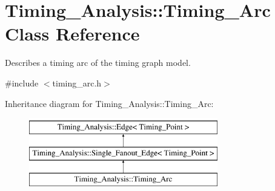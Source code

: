 \hypertarget{classTiming__Analysis_1_1Timing__Arc}{\section{Timing\-\_\-\-Analysis\-:\-:Timing\-\_\-\-Arc Class Reference}
\label{classTiming__Analysis_1_1Timing__Arc}
}


Describes a timing arc of the timing graph model.  




{\ttfamily \#include $<$timing\-\_\-arc.\-h$>$}

Inheritance diagram for Timing\-\_\-\-Analysis\-:\-:Timing\-\_\-\-Arc\-:\begin{figure}[H]
\begin{center}
\leavevmode
\includegraphics[height=3.000000cm]{classTiming__Analysis_1_1Timing__Arc}
\end{center}
\end{figure}

